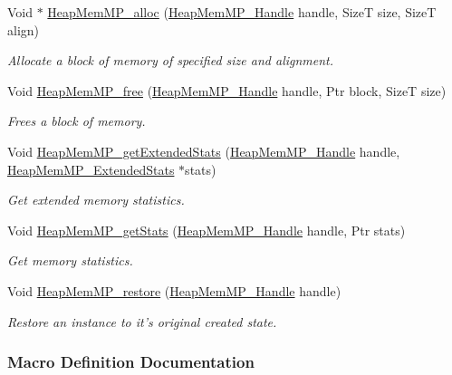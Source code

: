 \begin{DoxyCompactItemize}
Void $\ast$ \hyperlink{_heap_mem_m_p_8h_a04ab3af78110251e5f22f9bc9a961a95}{Heap\-Mem\-M\-P\-\_\-alloc} (\hyperlink{_heap_mem_m_p_8h_a9aa6360e22c2f5f387c5aba52a1a8522}{Heap\-Mem\-M\-P\-\_\-\-Handle} handle, Size\-T size, Size\-T align)
\begin{DoxyCompactList}\small\item\em Allocate a block of memory of specified size and alignment. \end{DoxyCompactList}\item 
Void \hyperlink{_heap_mem_m_p_8h_af424678d0776b662701672c9b737e0bc}{Heap\-Mem\-M\-P\-\_\-free} (\hyperlink{_heap_mem_m_p_8h_a9aa6360e22c2f5f387c5aba52a1a8522}{Heap\-Mem\-M\-P\-\_\-\-Handle} handle, Ptr block, Size\-T size)
\begin{DoxyCompactList}\small\item\em Frees a block of memory. \end{DoxyCompactList}\item 
Void \hyperlink{_heap_mem_m_p_8h_a1ee8a7319a0ed2344dea9d7b1bbbd3ee}{Heap\-Mem\-M\-P\-\_\-get\-Extended\-Stats} (\hyperlink{_heap_mem_m_p_8h_a9aa6360e22c2f5f387c5aba52a1a8522}{Heap\-Mem\-M\-P\-\_\-\-Handle} handle, \hyperlink{struct_heap_mem_m_p___extended_stats}{Heap\-Mem\-M\-P\-\_\-\-Extended\-Stats} $\ast$stats)
\begin{DoxyCompactList}\small\item\em Get extended memory statistics. \end{DoxyCompactList}\item 
Void \hyperlink{_heap_mem_m_p_8h_a5ce7746f4d08dd3fb94e692f6f544b67}{Heap\-Mem\-M\-P\-\_\-get\-Stats} (\hyperlink{_heap_mem_m_p_8h_a9aa6360e22c2f5f387c5aba52a1a8522}{Heap\-Mem\-M\-P\-\_\-\-Handle} handle, Ptr stats)
\begin{DoxyCompactList}\small\item\em Get memory statistics. \end{DoxyCompactList}\item 
Void \hyperlink{_heap_mem_m_p_8h_a8a610d9bdd7650bf42d52841915a42a0}{Heap\-Mem\-M\-P\-\_\-restore} (\hyperlink{_heap_mem_m_p_8h_a9aa6360e22c2f5f387c5aba52a1a8522}{Heap\-Mem\-M\-P\-\_\-\-Handle} handle)
\begin{DoxyCompactList}\small\item\em Restore an instance to it's original created state. \end{DoxyCompactList}\end{DoxyCompactItemize}


\subsubsection{Macro Definition Documentation}
